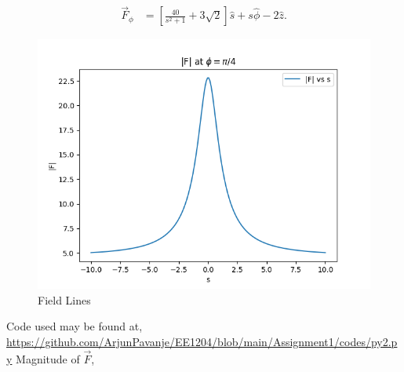\documentclass{article}
\begin{document}
\begin{align*}
\vec{F}_\phi &= 
    \left[ 
        \frac{40}{s^2+1} 
        + 3\sqrt{2} 
    \right] 
    \hat{s} 
    + s \hat{\phi} 
    - 2 \hat{z}.
\end{align*}
\begin{figure}[h!]
   \centering
   \includegraphics[width=0.6\columnwidth]{figs/fig2.png}
    \caption{Field Lines}
   \label{label}
\end{figure}
Code used may be found at, \newline \url{https://github.com/ArjunPavanje/EE1204/blob/main/Assignment1/codes/py2.py} \newline
Magnitude of $\vec{F}$,
\end{document}
